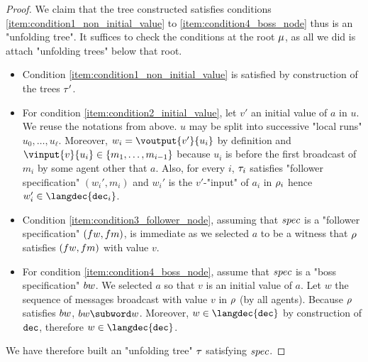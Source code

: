 \begin{proof}
	We claim that the tree constructed satisfies conditions \ref{item:condition1_non_initial_value} to \ref{item:condition4_boss_node} thus is an "unfolding tree". It suffices to check the conditions at the root $\mu$, as all we did is attach "unfolding trees" below that root. 
	\begin{itemize}
	\item Condition \ref{item:condition1_non_initial_value} is satisfied by construction of the trees $\tau'$.
	\item For condition \ref{item:condition2_initial_value}, let $v'$ an initial value of $a$ in $u$. We reuse the notations from above. $u$ may be split into successive "local runs" $u_0, \dots, u_\ell$. Moreover, $w_i  = \voutput{v'}{u_i}$ by definition and $\vinput{v}{u_i} \in \set{m_1,\dots,m_{i-1}}$ because $u_i$ is before the first broadcast of $m_i$ by some agent other that $a$. Also, for every $i$, $\tau_i$ satisfies "follower specification" $(w_i',m_i)$ and $w_i'$ is the $v'$-"input" of $a_i$ in $\rho_i$ hence $w_i' \in \langdec{\decsymb_i}$.
	\item Condition \ref{item:condition3_follower_node}, assuming that $\spec$ is a "follower specification" $(\followwordspec, \followmessagespec)$, is immediate as we selected $a$  to be a witness that $\rho$ satisfies $(\followwordspec, \followmessagespec)$ with value $v$. 
	\item For condition \ref{item:condition4_boss_node}, assume that $\spec$ is a "boss specification" $\bossspec$. We selected $a$ so that $v$ is an initial value of $a$. Let $w$ the sequence of messages broadcast with value $v$ in $\rho$ (by all agents). 
	Because $\rho$ satisfies $\bossspec$, $\bossspec \subword w$. Moreover, $w \in \langdec{\decsymb}$ by construction of $\mathtt{dec}$, therefore $w \in \langdec{\decsymb}$.
	\end{itemize}

	We have therefore built an "unfolding tree" $\tau$ satisfying $\spec$. 
\end{proof}
